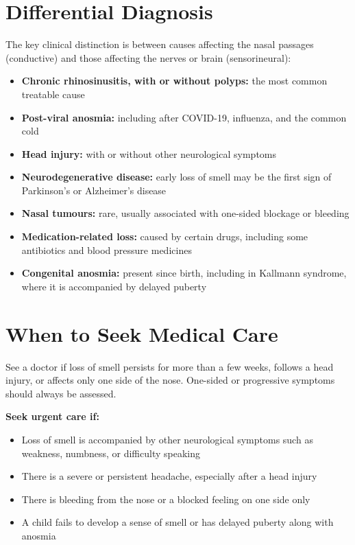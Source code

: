 \section*{Differential Diagnosis}
The key clinical distinction is between causes affecting the nasal passages (conductive) and those affecting the nerves or brain (sensorineural):

\begin{itemize}
    \item \textbf{Chronic rhinosinusitis, with or without polyps:} the most common treatable cause
    \item \textbf{Post-viral anosmia:} including after COVID-19, influenza, and the common cold
    \item \textbf{Head injury:} with or without other neurological symptoms
    \item \textbf{Neurodegenerative disease:} early loss of smell may be the first sign of Parkinson's or Alzheimer's disease
    \item \textbf{Nasal tumours:} rare, usually associated with one-sided blockage or bleeding
    \item \textbf{Medication-related loss:} caused by certain drugs, including some antibiotics and blood pressure medicines
    \item \textbf{Congenital anosmia:} present since birth, including in Kallmann syndrome, where it is accompanied by delayed puberty
\end{itemize}

\section*{When to Seek Medical Care}
See a doctor if loss of smell persists for more than a few weeks, follows a head injury, or affects only one side of the nose. One-sided or progressive symptoms should always be assessed.

\textbf{Seek urgent care if:}
\begin{itemize}
    \item Loss of smell is accompanied by other neurological symptoms such as weakness, numbness, or difficulty speaking
    \item There is a severe or persistent headache, especially after a head injury
    \item There is bleeding from the nose or a blocked feeling on one side only
    \item A child fails to develop a sense of smell or has delayed puberty along with anosmia
\end{itemize}

